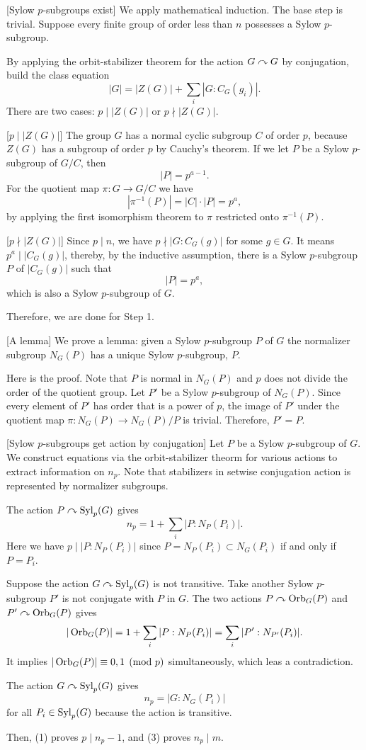 \documentclass{../exp}
\begin{document}
\begin{pf}
[Sylow $p$-subgroups exist]
We apply mathematical induction.
The base step is trivial.
Suppose every finite group of order less than $n$ possesses a Sylow $p$-subgroup.

By applying the orbit-stabilizer theorem for the action $G\curvearrowright G$ by conjugation, build the class equation
\[|G|=|Z(G)|+\sum_i|G:C_G(g_i)|.\]
There are two cases: $p\mid|Z(G)|$ or $p\nmid|Z(G)|$.

[$p\mid|Z(G)|$]
The group $G$ has a normal cyclic subgroup $C$ of order $p$, because $Z(G)$ has a subgroup of order $p$ by Cauchy's theorem.
If we let $P$ be a Sylow $p$-subgroup of $G/C$, then
\[|P|=p^{a-1}.\]
For the quotient map $\pi:G\to G/C$ we have
\[|\pi^{-1}(P)|=|C|\cdot|P|=p^a,\]
by applying the first isomorphism theorem to $\pi$ restricted onto $\pi^{-1}(P)$.

[$p\nmid|Z(G)|$]
Since $p\mid n$, we have $p\nmid|G:C_G(g)|$ for some $g\in G$.
It means $p^a\mid|C_G(g)|$, thereby, by the inductive assumption, there is a Sylow $p$-subgroup $P$ of $|C_G(g)|$ such that
\[|P|=p^a,\]
which is also a Sylow $p$-subgroup of $G$.

Therefore, we are done for Step 1.

\bigskip
{}[A lemma]
We prove a lemma: given a Sylow $p$-subgroup $P$ of $G$ the normalizer subgroup $N_G(P)$ has a unique Sylow $p$-subgroup, $P$.

Here is the proof.
Note that $P$ is normal in $N_G(P)$ and $p$ does not divide the order of the quotient group.
Let $P'$ be a Sylow $p$-subgroup of $N_G(P)$.
Since every element of $P'$ has order that is a power of $p$, the image of $P'$ under the quotient map $\pi:N_G(P)\to N_G(P)/P$ is trivial.
Therefore, $P'=P$.

\bigskip
{}[Sylow $p$-subgroups get action by conjugation]
Let $P$ be a Sylow $p$-subgroup of $G$.
We construct equations via the orbit-stabilizer theorm for various actions to extract information on $n_p$.
Note that stabilizers in setwise conjugation action is represented by normalizer subgroups.
\begin{cond}
\item The action $P\curvearrowright\operatorname{Syl}_p(G)$ gives
\[n_p=1+\sum_i|P:N_P(P_i)|.\]
Here we have $p\mid |P:N_P(P_i)|$ since $P=N_P(P_i)\subset N_G(P_i)$ if and only if $P=P_i$.
\item Suppose the action $G\curvearrowright\operatorname{Syl}_p(G)$ is not transitive.
Take another Sylow $p$-subgroup $P'$ is not conjugate with $P$ in $G$.
The two actions $P\curvearrowright\operatorname{Orb}_G(P)$ and $P'\curvearrowright\operatorname{Orb}_G(P)$ gives
\[|\operatorname{Orb}_G(P)|=1+\sum_i|P:N_P(P_i)|=\sum_i|P':N_{P'}(P_i)|.\]
It implies $|\operatorname{Orb}_G(P)|\equiv0,1\pmod{p}$ simultaneously, which leas a contradiction.
\item The action $G\curvearrowright\operatorname{Syl}_p(G)$ gives
\[n_p=|G:N_G(P_i)|\]
for all $P_i\in\operatorname{Syl}_p(G)$ because the action is transitive.
\end{cond}
Then, (1) proves $p\mid n_p-1$, and (3) proves $n_p\mid m$.
\end{pf}
\end{document}
